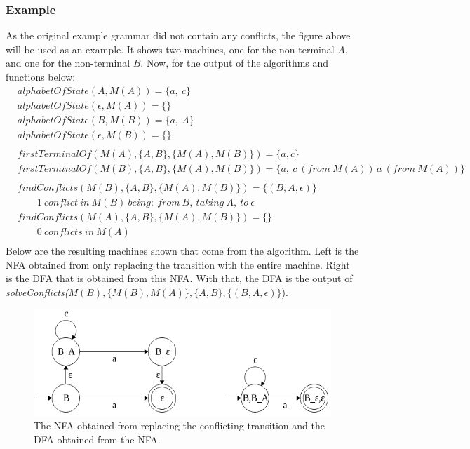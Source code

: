 	\subsubsection{Example}
	As the original example grammar did not contain any conflicts, the figure above will be used as an example. It shows two machines, one for the non-terminal $A$, and one for the non-terminal $B$. Now, for the output of the algorithms and functions below:\\
	\begin{align*}
	&alphabetOfState(A, M(A)) = \{a,\ c\}\\
	&alphabetOfState(\epsilon, M(A)) = \{\}\\
	&alphabetOfState(B, M(B)) = \{a,\ A\}\\
	&alphabetOfState(\epsilon, M(B)) = \{\}\\\\
	&firstTerminalOf(M(A), \{A, B\}, \{M(A), M(B)\}) = \{a, c\}\\
	&firstTerminalOf(M(B), \{A, B\}, \{M(A), M(B)\}) = \{a,\ c\ (from\ M(A))\, a\ (from\ M(A))\}\\\\
	&findConflicts(M(B), \{A, B\}, \{M(A), M(B)\}) = \{(B, A, \epsilon)\}\\
	&\qquad 1\ conflict\ in\ M(B)\ being:\ from\ B,\ taking\ A,\ to\ \epsilon\\
	&findConflicts(M(A), \{A, B\}, \{M(A), M(B)\}) = \{\}\\
	&\qquad 0\ conflicts\ in\ M(A)\\
	\end{align*}
	Below are the resulting machines shown that come from the algorithm. Left is the NFA obtained from only replacing the transition with the entire machine. Right is the DFA that is obtained from this NFA. With that, the DFA is the output of \textit{solveConflicts($M(B), \{M(B), M(A)\}, \{A, B\}, \{(B, A, \epsilon)\}$}).
	\begin{figure}[H]
		\centering
		\includegraphics[width=\textwidth, keepaspectratio]{Figures/conflictSolvingChap2.png}
		\decoRule
	 	\caption[Conflict resolving NFA to DFA]{The NFA obtained from replacing the conflicting transition and the DFA obtained from the NFA.}
	 	\label{fig:chap2:NFA2DFA:ConflictSolving}
	\end{figure}
	
